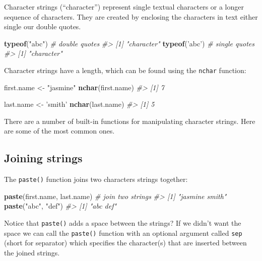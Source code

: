 \documentclass[]{book}
\newenvironment{Shaded}{\begin{snugshade}}{\end{snugshade}}
\newcommand{\CommentTok}[1]{\textcolor[rgb]{0.56,0.35,0.01}{\textit{#1}}}
\newcommand{\KeywordTok}[1]{\textcolor[rgb]{0.13,0.29,0.53}{\textbf{#1}}}
\newcommand{\NormalTok}[1]{#1}
\newcommand{\StringTok}[1]{\textcolor[rgb]{0.31,0.60,0.02}{#1}}
\theoremstyle{definition}
\theoremstyle{definition}
\theoremstyle{definition}
\theoremstyle{remark}
\begin{document}
Character strings (``character'') represent single textual characters or
a longer sequence of characters. They are created by enclosing the
characters in text either single our double quotes.

\begin{Shaded}
\begin{Highlighting}[]
\KeywordTok{typeof}\NormalTok{(}\StringTok{"abc"}\NormalTok{)  }\CommentTok{# double quotes }
\CommentTok{#> [1] "character"}
\KeywordTok{typeof}\NormalTok{(}\StringTok{'abc'}\NormalTok{)  }\CommentTok{# single quotes}
\CommentTok{#> [1] "character"}
\end{Highlighting}
\end{Shaded}

Character strings have a length, which can be found using the
\texttt{nchar} function:

\begin{Shaded}
\begin{Highlighting}[]
\NormalTok{first.name <-}\StringTok{ "jasmine"}
\KeywordTok{nchar}\NormalTok{(first.name)}
\CommentTok{#> [1] 7}

\NormalTok{last.name <-}\StringTok{ 'smith'}
\KeywordTok{nchar}\NormalTok{(last.name)}
\CommentTok{#> [1] 5}
\end{Highlighting}
\end{Shaded}

There are a number of built-in functions for manipulating character
strings. Here are some of the most common ones.

\hypertarget{joining-strings}{%
\subsection{Joining strings}\label{joining-strings}}

The \texttt{paste()} function joins two characters strings together:

\begin{Shaded}
\begin{Highlighting}[]
\KeywordTok{paste}\NormalTok{(first.name, last.name)  }\CommentTok{# join two strings}
\CommentTok{#> [1] "jasmine smith"}
\KeywordTok{paste}\NormalTok{(}\StringTok{"abc"}\NormalTok{, }\StringTok{"def"}\NormalTok{)}
\CommentTok{#> [1] "abc def"}
\end{Highlighting}
\end{Shaded}

Notice that \texttt{paste()} adds a space between the strings? If we
didn't want the space we can call the \texttt{paste()} function with an
optional argument called \texttt{sep} (short for separator) which
specifies the character(s) that are inserted between the joined strings.
\end{document}
